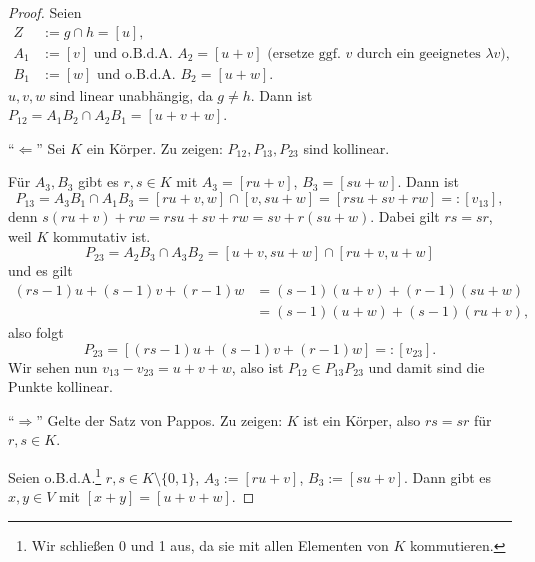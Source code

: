 \begin{proof}
 Seien 
 \[ \begin{aligned}
     Z   &:= g \cap h = [u], \\
     A_1 &:= [v] \text{ und o.B.d.A. } A_2 = [u + v] \text{ (ersetze ggf. $v$ durch ein geeignetes $\lambda v$)}, \\
     B_1 &:= [w] \text{ und o.B.d.A. } B_2 = [u + w].
    \end{aligned} \]
 $u, v, w$ sind linear unabhängig, da $g \ne h$. Dann ist $P_{12} = A_1 B_2 \cap A_2 B_1 = [u + v + w]$. 
 
 ``$\Leftarrow$'' Sei $K$ ein Körper. Zu zeigen: $P_{12}, P_{13}, P_{23}$ sind kollinear.
 
 Für $A_3, B_3$ gibt es $r, s \in K$ mit $A_3 = [ru+v]$, $B_3 = [su+w]$. Dann ist 
 \[ P_{13} = A_3 B_1 \cap A_1 B_3 = [ru + v, w] \cap [v, su + w] = [rsu+sv+rw] =: [v_{13}], \]
 denn $s(ru+v) + rw = rsu + sv + rw = sv + r(su + w)$. Dabei gilt $rs = sr$, weil $K$ kommutativ ist.
 \[ P_{23} = A_2 B_3 \cap A_3 B_2 = [u+v, su + w] \cap [ru + v, u+w] \]
 und es gilt
 \[ \begin{aligned}
    (rs-1)u + (s-1)v + (r-1)w 
    &= (s-1) (u+v) + (r-1)(su +w) \\
    &= (s-1)(u+w) + (s-1)(ru+v),
    \end{aligned} \]
 also folgt
 \[ P_{23} = [ (rs-1)u + (s-1)v + (r-1)w ] =: [v_{23}]. \]
 Wir sehen nun $v_{13} - v_{23} = u + v + w$, also ist $P_{12} \in P_{13} P_{23}$ und damit sind die Punkte kollinear.
 
 ``$\Rightarrow$'' Gelte der Satz von Pappos. Zu zeigen: $K$ ist ein Körper, also $rs = sr$ für $r,s \in K$.
 
 Seien o.B.d.A.\footnote{Wir schließen 0 und 1 aus, da sie mit allen Elementen von $K$ kommutieren.} $r,s \in K \setminus \{ 0, 1 \}$, $A_3 := [ru+v]$, $B_3 := [su+v]$. Dann gibt es $x,y \in V$ mit $[x+y] = [u + v + w]$.
 

\end{proof}
